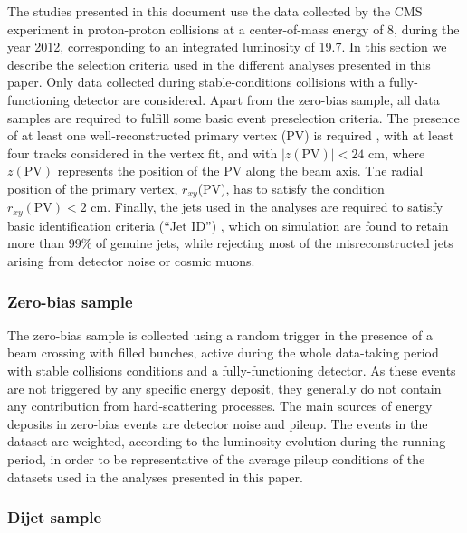 \documentclass[11pt,twoside,a4paper,cmspaper,final,collab]{cms-tdr}
\begin{document}
The studies presented in this document use the data collected by the CMS experiment in proton-proton collisions at a center-of-mass
energy of 8\TeV, during the year 2012, corresponding to an integrated luminosity of 19.7\fbinv.
In this section we describe the selection criteria used in the different analyses presented in this paper.
Only data collected during stable-conditions collisions with a fully-functioning detector are considered.
Apart from the zero-bias sample, all data samples are required to fulfill some basic event preselection criteria.
The presence of at least one well-reconstructed primary vertex (PV) is required \cite{Chatrchyan:2014fea}, with at least four tracks considered
in the vertex fit, and with $ \vert z(\mathrm{PV}) \vert <24$ cm, where $z(\mathrm{PV})$ represents the position of the PV along the beam axis.
The radial position of the primary vertex, $r_{xy}$(PV), has to satisfy the condition $r_{xy}(\mathrm{PV})<2$ cm.
Finally, the jets used in the analyses are required to satisfy basic identification criteria (``Jet ID'') \cite{CMS-PAS-JME-10-003}, which on simulation are found to retain more than 99\% of genuine jets, while rejecting most of the misreconstructed jets arising from detector noise or cosmic muons.

\subsubsection*{Zero-bias sample}

The zero-bias sample is collected using a random trigger in the presence of a beam crossing with filled bunches, active during the whole data-taking period with stable collisions conditions and a fully-functioning detector. As these events are not triggered by
any specific energy deposit, they generally do not contain any contribution from hard-scattering processes. The main sources of energy
deposits in zero-bias events are detector noise and pileup. The events in the dataset are weighted, according to the luminosity evolution during the running period, in order to be representative of the average pileup conditions of the datasets used in the analyses presented in this paper.

\subsubsection*{Dijet sample}
\end{document}
